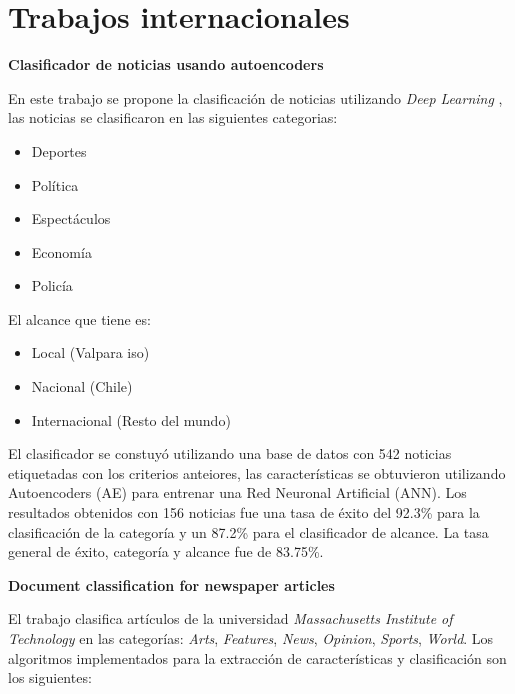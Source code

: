 \newpage
\section[Trabajos i.]{Trabajos internacionales}

\begin{large}
	 \textbf{Clasificador de noticias usando autoencoders}\\
\end{large}

En este trabajo se propone la clasificación de noticias utilizando \textit{Deep Learning} \citep{CD3}, las noticias se clasificaron en las siguientes categorias:

\begin{itemize}
	\item Deportes
	\item Política
	\item Espectáculos
	\item Economía
	\item Policía
\end{itemize}
El alcance que tiene es:
\begin{itemize}
	\item Local (Valpara iso)
	\item Nacional (Chile)
	\item Internacional (Resto del mundo)
\end{itemize}

El clasificador se constuyó utilizando una base de datos con 542 noticias etiquetadas con los criterios anteiores, las características se obtuvieron utilizando Autoencoders (AE) para entrenar una Red Neuronal Artificial (ANN).
Los resultados obtenidos con 156 noticias fue una tasa de éxito del 92.3\% para la clasificación de la categoría y un 87.2\% para el clasificador de alcance.
La tasa general de éxito, categoría y alcance fue de 83.75\%.\\

\begin{large}
	 \textbf{Document classification for newspaper articles}\\
\end{large}

El trabajo clasifica artículos de la universidad \textit{Massachusetts Institute of Technology} \citep{CD4} en las categorías: \textit{Arts}, \textit{Features}, \textit{News}, \textit{Opinion}, \textit{Sports}, \textit{World}. Los algoritmos implementados para la extracción de características y clasificación son los siguientes:\\


